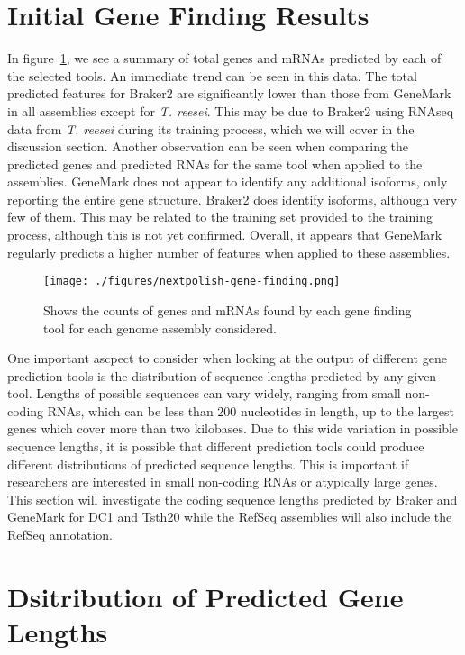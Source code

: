\section{Initial Gene Finding Results} 

In figure~\ref{fig:genecounts}, we see a summary of total genes and mRNAs
predicted by each of the selected tools. An immediate trend can be
seen in this data. The total predicted features for Braker2 are
significantly lower than those from GeneMark in all assemblies except
for \textit{T. reesei}. This may be due to Braker2 using RNAseq data
from \textit{T. reesei} during its training process, which we will
cover in the discussion section. Another observation can be seen when
comparing the predicted genes and predicted RNAs for the same tool
when applied to the assemblies. GeneMark does not appear to identify
any additional isoforms, only reporting the entire gene
structure. Braker2 does identify isoforms, although very few of
them. This may be related to the training set provided to the training
process, although this is not yet confirmed. Overall, it appears that
GeneMark regularly predicts a higher number of features when applied
to these assemblies.

\begin{figure}
  \texttt{[image: ./figures/nextpolish-gene-finding.png]}
  \caption{Shows the counts of genes and mRNAs found by each gene
    finding tool for each genome assembly considered.}
  \label{fig:genecounts}
\end{figure}

One important ascpect to consider when looking at the output of
different gene prediction tools is the distribution of sequence
lengths predicted by any given tool. Lengths of possible sequences can
vary widely, ranging from small non-coding RNAs, which can be less
than 200 nucleotides in length, up to the largest genes which cover
more than two kilobases. Due to this wide variation in possible
sequence lengths, it is possible that different prediction tools could
produce different distributions of predicted sequence lengths. This is
important if researchers are interested in small non-coding RNAs or
atypically large genes. This section will investigate the coding
sequence lengths predicted by Braker and GeneMark for DC1 and Tsth20
while the RefSeq assemblies will also include the RefSeq annotation.

\section{Dsitribution of Predicted Gene Lengths}

